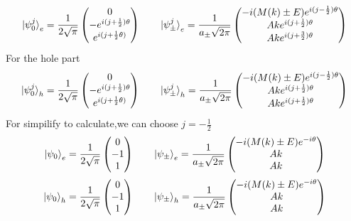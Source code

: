 \documentclass[4pt]{article}
\begin{document}
\begin{align}
	\ket{\psi_0^j}_e=\frac{1}{2\sqrt{\pi}}
	\begin{pmatrix}
		0\\
		-e^{i(j+\frac{1}{2})\theta}\\
		e^{i(j+\frac{1}{2}\theta)}
	\end{pmatrix}
	\qquad
	\ket{\psi_{\pm}^j}_e=\frac{1}{a_{\pm}\sqrt{2\pi}}
	\begin{pmatrix}
		-i(M(k)\pm E)e^{i(j-\frac{1}{2})\theta}\\
		Ake^{i(j+\frac{1}{2})\theta}\\
		Ake^{i(j+\frac{3}{2})\theta}
	\end{pmatrix}
\end{align}
For the hole part
\begin{align}
	\ket{\psi_0^j}_h=\frac{1}{2\sqrt{\pi}}
	\begin{pmatrix}
		0\\
		-e^{i(j+\frac{1}{2})\theta}\\
		e^{i(j+\frac{1}{2}\theta)}
	\end{pmatrix}
	\qquad
	\ket{\psi_{\pm}^j}_h=\frac{1}{a_{\pm}\sqrt{2\pi}}
	\begin{pmatrix}
		-i(M(k)\pm E)e^{i(j-\frac{1}{2})\theta}\\
		Ake^{i(j+\frac{1}{2})\theta}\\
		Ake^{i(j+\frac{1}{2})\theta}
	\end{pmatrix}
\end{align}
For simpilify to calculate,we can choose $j=-\frac{1}{2}$
\begin{align}
	\ket{\psi_0}_e=\frac{1}{2\sqrt{\pi}}
	\begin{pmatrix}
		0\\
		-1\\
		1
	\end{pmatrix}
	\qquad
	\ket{\psi_{\pm}}_e=\frac{1}{a_{\pm}\sqrt{2\pi}}
	\begin{pmatrix}
		-i(M(k)\pm E)e^{-i\theta}\\
		Ak\\
		Ak
	\end{pmatrix}
\end{align}
\begin{align}
	\ket{\psi_0}_h=\frac{1}{2\sqrt{\pi}}
	\begin{pmatrix}
		0\\
		-1\\
		1
	\end{pmatrix}
	\qquad
	\ket{\psi_{\pm}}_h=\frac{1}{a_{\pm}\sqrt{2\pi}}
	\begin{pmatrix}
		-i(M(k)\pm E)e^{-i\theta}\\
		Ak\\
		Ak
	\end{pmatrix}
\end{align}	
\end{document}

